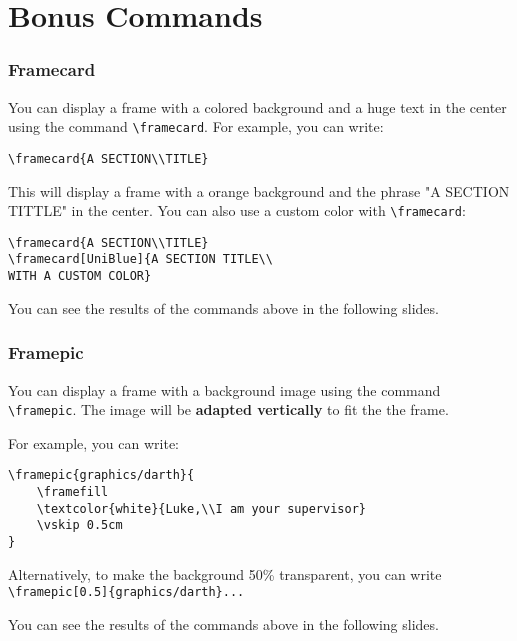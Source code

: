 \documentclass[usenames,dvipsnames]{beamer}
\newcommand{\framefill}{\vskip0pt plus 1filll}
\begin{document}
\section{Bonus Commands}

\begin{frame}[fragile]
\frametitle{Framecard}

You can display a frame with a colored background and a huge text in the center using the command \texttt{\textbackslash framecard}.
\vskip 0.5cm 
For example, you can write:
\begin{verbatim}
\framecard{A SECTION\\TITLE}
\end{verbatim}

This will display a frame with a orange background and the phrase "A SECTION TITTLE" in the center. You can also use a custom color with \texttt{\textbackslash framecard}:
\begin{verbatim}
\framecard{A SECTION\\TITLE}
\framecard[UniBlue]{A SECTION TITLE\\
WITH A CUSTOM COLOR}
\end{verbatim}
You can see the results of the commands above in the following slides.

\end{frame}


\begin{frame}[fragile]
\frametitle{Framepic}

You can display a frame with a background image using the command \texttt{\textbackslash framepic}. The image will be \textbf{adapted vertically} to fit the the frame. 

For example, you can write:
\begin{verbatim}
\framepic{graphics/darth}{
	\framefill
    \textcolor{white}{Luke,\\I am your supervisor}
    \vskip 0.5cm
}
\end{verbatim}

Alternatively, to make the background 50\% transparent, you can write \texttt{\textbackslash framepic[0.5]\{graphics/darth\}...}


You can see the results of the commands above in the following slides.

\end{frame}
\end{document}
